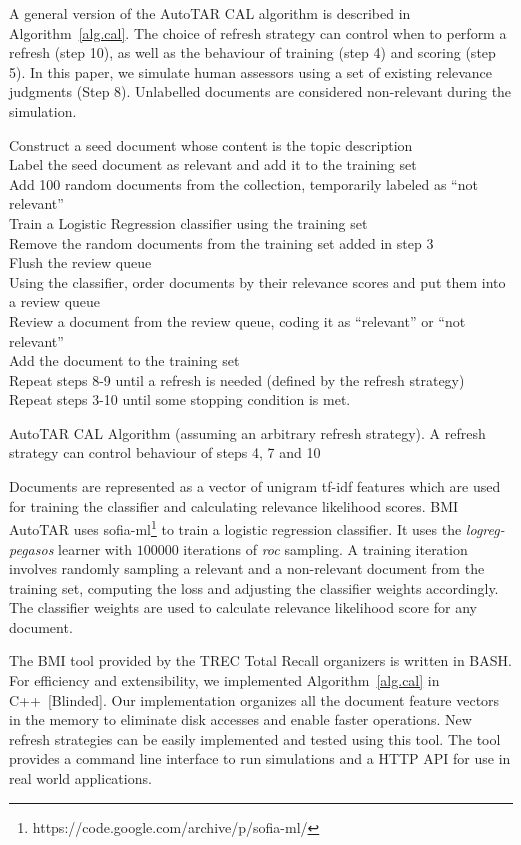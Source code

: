 \label{sec.cal}
A general version of the AutoTAR CAL algorithm is described in
Algorithm~\ref{alg.cal}.  The choice of refresh strategy can control when to
perform a refresh (step 10), as well as the behaviour of training (step 4) and
scoring (step 5). In this paper, we simulate human assessors using a set of
existing relevance judgments (Step 8). Unlabelled documents are considered
non-relevant during the simulation.

\begin{algorithm}[]
Construct a seed document whose content is the topic description \\
Label the seed document as relevant and add it to the training set \\
Add 100 random documents from the collection, temporarily labeled as ``not
relevant'' \\
Train a Logistic Regression classifier using the training set \\
Remove the random documents from the training set added in step 3 \\
Flush the review queue \\
Using the classifier, order documents by their relevance scores and put them
into a review queue \\ Review a document from the review queue, coding it as
``relevant'' or ``not relevant'' \\
Add the document to the training set \\
Repeat steps 8-9 until a refresh is needed (defined by the refresh strategy) \\
Repeat steps 3-10 until some stopping condition is met.
\caption{AutoTAR CAL Algorithm (assuming an arbitrary refresh strategy). A refresh
strategy can control behaviour of steps 4, 7 and 10}
\label{alg.cal}
\end{algorithm}

Documents are represented as a vector of unigram tf-idf features which are used
for training the classifier and calculating relevance likelihood scores. BMI
AutoTAR uses sofia-ml\footnote{https://code.google.com/archive/p/sofia-ml/}
\cite{sculley2010combined} to train a logistic regression classifier. It uses
the \textit{logreg-pegasos} learner with $100000$ iterations of \textit{roc}
sampling. A training iteration involves randomly sampling a relevant and a
non-relevant document from the training set, computing the loss and adjusting
the classifier weights accordingly. The classifier weights are used to calculate
relevance likelihood score for any document.

The BMI tool provided by the TREC Total Recall organizers is written in BASH.
For efficiency and extensibility, we implemented Algorithm~\ref{alg.cal} in
C++~[Blinded]. Our implementation organizes all the document feature vectors in
the memory to eliminate disk accesses and enable faster operations. New refresh
strategies can be easily implemented and tested using this tool. The tool
provides a command line interface to run simulations and a HTTP API for use in
real world applications.
